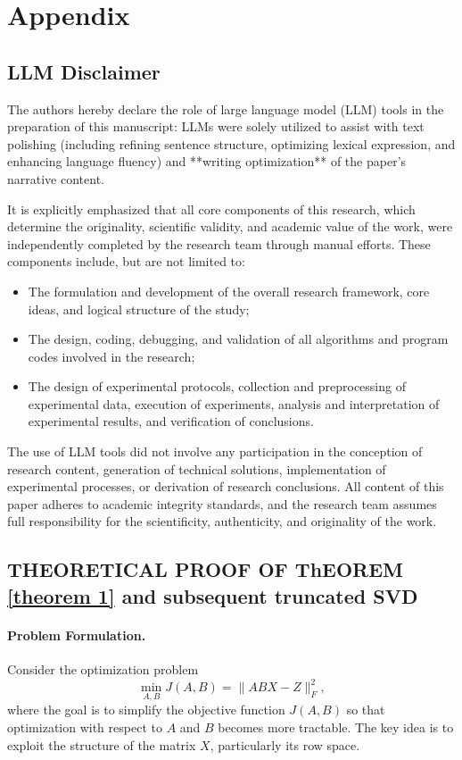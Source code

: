 \clearpage
\appendix
\section{Appendix}
\subsection{LLM Disclaimer}
The authors hereby declare the role of large language model (LLM) tools in the preparation of this manuscript: LLMs were solely utilized to assist with text polishing (including refining sentence structure, optimizing lexical expression, and enhancing language fluency) and **writing optimization** of the paper’s narrative content.  

It is explicitly emphasized that all core components of this research, which determine the originality, scientific validity, and academic value of the work, were independently completed by the research team through manual efforts. These components include, but are not limited to:  
\begin{itemize}
    \item The formulation and development of the overall research framework, core ideas, and logical structure of the study; 
    \item The design, coding, debugging, and validation of all algorithms and program codes involved in the research;  
    \item The design of experimental protocols, collection and preprocessing of experimental data, execution of experiments, analysis and interpretation of experimental results, and verification of conclusions.  
\end{itemize}


The use of LLM tools did not involve any participation in the conception of research content, generation of technical solutions, implementation of experimental processes, or derivation of research conclusions. All content of this paper adheres to academic integrity standards, and the research team assumes full responsibility for the scientificity, authenticity, and originality of the work.



\newpage
\subsection{THEORETICAL PROOF OF ThEOREM \ref{theorem 1} and subsequent truncated SVD } \label{theorem1 derivation}
\paragraph{Problem Formulation.} 
Consider the optimization problem
\begin{equation}
   \min_{A,B} J(A,B) = \|ABX - Z\|_F^2,
\end{equation}
where the goal is to simplify the objective function $J(A,B)$ so that optimization with respect to $A$ and $B$ becomes more tractable. The key idea is to exploit the structure of the matrix $X$, particularly its row space.

